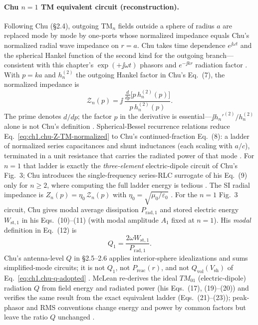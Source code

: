 \paragraph{Chu $n=1$ TM equivalent circuit (reconstruction).}
Following Chu \cite{chu1948,chu1948tr064} (\S2.4), outgoing TM$_n$ fields outside a sphere of radius $a$ are replaced mode by mode by one-ports whose normalized impedance equals Chu's normalized radial wave impedance on $r=a$. Chu takes time dependence $e^{\jj\omega t}$ and the spherical Hankel function of the second kind for the outgoing branch---consistent with this chapter's $\exp(+\jj\omega t)$ phasors and $e^{-\jj kr}$ radiation factor \cite{chu1948,chu1948tr064,stratton1941}. With $p=ka$ and $h_n^{(2)}$ the outgoing Hankel factor in Chu's Eq.~(7), the normalized impedance is
\begin{equation}
\label{eq:ch1.chu-Z-TM-normalized}
\mathcal{Z}_n(p)=\jj\,\frac{\displaystyle\frac{d}{dp}\bigl[p\,h_n^{(2)}(p)\bigr]}{p\,h_n^{(2)}(p)}.
\end{equation}
The prime denotes $d/dp$; the factor $p$ in the derivative is essential---$\jj h_n'^{(2)}/h_n^{(2)}$ alone is not Chu's definition \cite{chu1948tr064}. Spherical-Bessel recurrence relations reduce Eq.~\eqref{eq:ch1.chu-Z-TM-normalized} to Chu's continued-fraction Eq.~(8): a ladder of normalized series capacitances and shunt inductances (each scaling with $a/c$), terminated in a unit resistance that carries the radiated power of that mode \cite{chu1948tr064}. For $n=1$ that ladder is exactly the \emph{three-element} electric-dipole circuit of Chu's Fig.~3; Chu introduces the single-frequency series-RLC surrogate of his Eq.~(9) only for $n\ge2$, where computing the full ladder energy is tedious \cite{chu1948tr064}. The SI radial impedance is $Z_n(p)=\eta_0\,\mathcal{Z}_n(p)$ with $\eta_0=\sqrt{\mu_0/\varepsilon_0}$ \cite{chu1948,stratton1941}. For the $n=1$ Fig.~3 circuit, Chu gives modal average dissipation $P_{\mathrm{rad,1}}$ and stored electric energy $W_{\mathrm{st,1}}$ in his Eqs.~(10)--(11) (with modal amplitude $A_1$ fixed at $n=1$). His \emph{modal} definition in Eq.~(12) is
\begin{equation}
\label{eq:ch1.chu-Qn-def}
Q_1=\frac{2\omega W_{\mathrm{st,1}}}{P_{\mathrm{rad,1}}}.
\end{equation}
Chu's antenna-level $Q$ in \S2.5--2.6 applies interior-sphere idealizations and sums simplified-mode circuits; it is not $Q_1$, not $P_{\mathrm{reac}}(r)$, and not $Q_{\mathrm{vol}}(V_{\mathrm{sh}})$ of Eq.~\eqref{eq:ch1.chu-q-adopted} \cite{chu1948,chu1948tr064,mcclean1996}. McLean \cite{mcclean1996} re-derives the ideal $TM_{01}$ (electric-dipole) radiation $Q$ from field energy and radiated power (his Eqs.~(17), (19)--(20)) and verifies the same result from the exact equivalent ladder (Eqs.~(21)--(23)); peak-phasor and RMS conventions change energy and power by common factors but leave the ratio $Q$ unchanged \cite{mcclean1996,chu1948tr064}.

